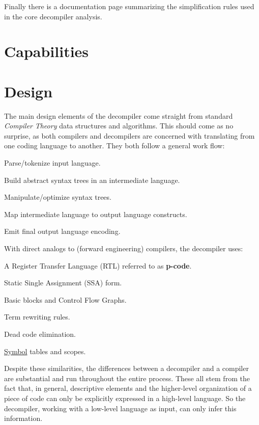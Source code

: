 Finally there is a documentation page summarizing the simplification rules used in the core decompiler analysis.\hypertarget{index_capabilities}{}\section{Capabilities}\label{index_capabilities}
\hypertarget{index_design}{}\section{Design}\label{index_design}
The main design elements of the decompiler come straight from standard {\itshape Compiler} {\itshape Theory} data structures and algorithms. This should come as no surprise, as both compilers and decompilers are concerned with translating from one coding language to another. They both follow a general work flow\+:


\begin{DoxyItemize}
\item Parse/tokenize input language.
\item Build abstract syntax trees in an intermediate language.
\item Manipulate/optimize syntax trees.
\item Map intermediate language to output language constructs.
\item Emit final output language encoding.
\end{DoxyItemize}

With direct analogs to (forward engineering) compilers, the decompiler uses\+:


\begin{DoxyItemize}
\item A Register Transfer Language (R\+TL) referred to as {\bfseries{p-\/code}}.
\item Static Single Assignment (S\+SA) form.
\item Basic blocks and Control Flow Graphs.
\item Term rewriting rules.
\item Dead code elimination.
\item \mbox{\hyperlink{class_symbol}{Symbol}} tables and scopes.
\end{DoxyItemize}

Despite these similarities, the differences between a decompiler and a compiler are substantial and run throughout the entire process. These all stem from the fact that, in general, descriptive elements and the higher-\/level organization of a piece of code can only be explicitly expressed in a high-\/level language. So the decompiler, working with a low-\/level language as input, can only infer this information.

